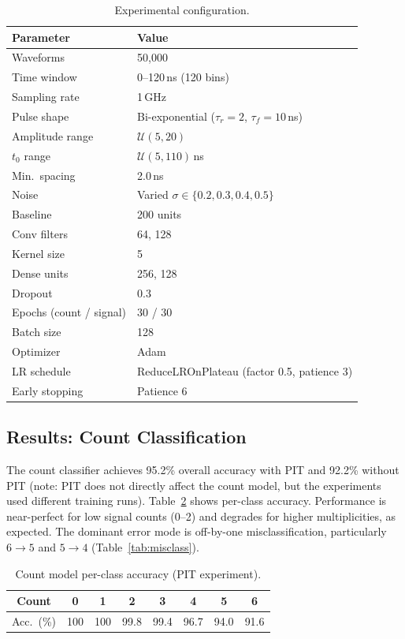 \documentclass[11pt,twocolumn]{article}
\begin{document}
\begin{table}[t]
\centering
\caption{Experimental configuration.}
\label{tab:config}
\small
\begin{tabular}{ll}
\toprule
\textbf{Parameter} & \textbf{Value} \\
\midrule
Waveforms & 50{,}000 \\
Time window & 0--120\,ns (120 bins) \\
Sampling rate & 1\,GHz \\
Pulse shape & Bi-exponential ($\tau_r{=}2$, $\tau_f{=}10$\,ns) \\
Amplitude range & $\mathcal{U}(5, 20)$ \\
$t_0$ range & $\mathcal{U}(5, 110)$\,ns \\
Min.\ spacing & 2.0\,ns \\
Noise & Varied $\sigma \in \{0.2, 0.3, 0.4, 0.5\}$ \\
Baseline & 200 units \\
\midrule
Conv filters & 64, 128 \\
Kernel size & 5 \\
Dense units & 256, 128 \\
Dropout & 0.3 \\
Epochs (count / signal) & 30 / 30 \\
Batch size & 128 \\
Optimizer & Adam \\
LR schedule & ReduceLROnPlateau (factor 0.5, patience 3) \\
Early stopping & Patience 6 \\
\bottomrule
\end{tabular}
\end{table}

\subsection{Results: Count Classification}

The count classifier achieves 95.2\% overall accuracy with PIT and 92.2\% without PIT (note: PIT does not directly affect the count model, but the experiments used different training runs).
Table~\ref{tab:count_results} shows per-class accuracy.
Performance is near-perfect for low signal counts (0--2) and degrades for higher multiplicities, as expected.
The dominant error mode is off-by-one misclassification, particularly $6 \to 5$ and $5 \to 4$ (Table~\ref{tab:misclass}).

\begin{table}[t]
\centering
\caption{Count model per-class accuracy (PIT experiment).}
\label{tab:count_results}
\small
\begin{tabular}{cccccccc}
\toprule
Count & 0 & 1 & 2 & 3 & 4 & 5 & 6 \\
\midrule
Acc.\ (\%) & 100 & 100 & 99.8 & 99.4 & 96.7 & 94.0 & 91.6 \\
\bottomrule
\end{tabular}
\end{table}
\end{document}
